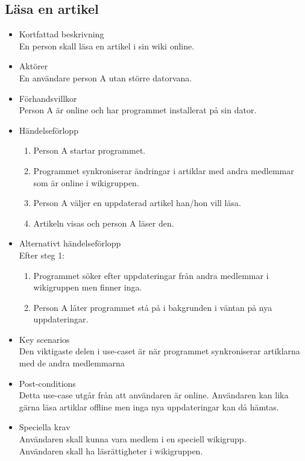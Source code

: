 \subsection{Läsa en artikel}
\begin{itemize}
	\item Kortfattad beskrivning
	\\En person skall läsa en artikel i sin wiki online.
	\item Aktörer
	\\En användare person A utan större datorvana.
	\item Förhandsvillkor
	\\Person A är online och har programmet installerat på sin dator.
	\item Händelseförlopp
	\begin{enumerate}
		\item Person A startar programmet.
		\item Programmet synkroniserar ändringar i artiklar med andra medlemmar som är online i wikigruppen.
		\item Person A väljer en uppdaterad artikel han/hon vill läsa.
		\item Artikeln visas och person A läser den.
	\end{enumerate}
	\item Alternativt händelseförlopp
	\\Efter steg 1:
	\begin{enumerate}	
		\item Programmet söker efter uppdateringar från andra medlemmar i wikigruppen men finner inga.
		\item Person A låter programmet stå på i bakgrunden i väntan på nya uppdateringar.	
	\end{enumerate}	
	\item Key scenarios
	\\Den viktigaste delen i use-caset är när programmet synkroniserar artiklarna med de andra medlemmarna
	\item Post-conditions
	\\Detta use-case utgår från att användaren är online. Användaren kan lika gärna läsa artiklar offline men inga nya uppdateringar kan då hämtas.
	\item Speciella krav
	\\Användaren skall kunna vara medlem i en speciell wikigrupp.
	\\Användaren skall ha läsrättigheter i wikigruppen.
\end{itemize}

